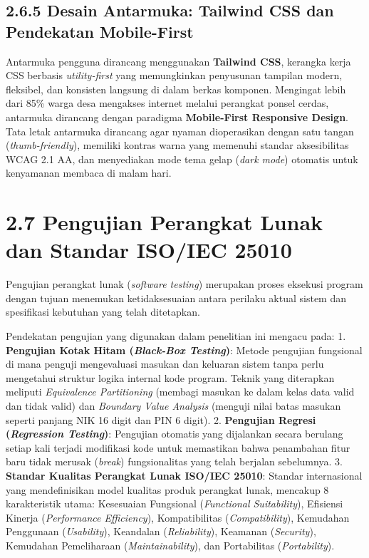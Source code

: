 \documentclass[
  indonesian,
  12pt,
]{report}
\begin{document}
\subsection{2.6.5 Desain Antarmuka: Tailwind CSS dan Pendekatan
Mobile-First}\label{desain-antarmuka-tailwind-css-dan-pendekatan-mobile-first}

Antarmuka pengguna dirancang menggunakan \textbf{Tailwind CSS}, kerangka
kerja CSS berbasis \emph{utility-first} yang memungkinkan penyusunan
tampilan modern, fleksibel, dan konsisten langsung di dalam berkas
komponen. Mengingat lebih dari 85\% warga desa mengakses internet
melalui perangkat ponsel cerdas, antarmuka dirancang dengan paradigma
\textbf{Mobile-First Responsive Design}. Tata letak antarmuka dirancang
agar nyaman dioperasikan dengan satu tangan (\emph{thumb-friendly}),
memiliki kontras warna yang memenuhi standar aksesibilitas WCAG 2.1 AA,
dan menyediakan mode tema gelap (\emph{dark mode}) otomatis untuk
kenyamanan membaca di malam hari.

\section{2.7 Pengujian Perangkat Lunak dan Standar ISO/IEC
25010}\label{pengujian-perangkat-lunak-dan-standar-isoiec-25010}

Pengujian perangkat lunak (\emph{software testing}) merupakan proses
eksekusi program dengan tujuan menemukan ketidaksesuaian antara perilaku
aktual sistem dan spesifikasi kebutuhan yang telah ditetapkan.

Pendekatan pengujian yang digunakan dalam penelitian ini mengacu pada:
1. \textbf{Pengujian Kotak Hitam (\emph{Black-Box Testing})}: Metode
pengujian fungsional di mana penguji mengevaluasi masukan dan keluaran
sistem tanpa perlu mengetahui struktur logika internal kode program.
Teknik yang diterapkan meliputi \emph{Equivalence Partitioning} (membagi
masukan ke dalam kelas data valid dan tidak valid) dan \emph{Boundary
Value Analysis} (menguji nilai batas masukan seperti panjang NIK 16
digit dan PIN 6 digit). 2. \textbf{Pengujian Regresi (\emph{Regression
Testing})}: Pengujian otomatis yang dijalankan secara berulang setiap
kali terjadi modifikasi kode untuk memastikan bahwa penambahan fitur
baru tidak merusak (\emph{break}) fungsionalitas yang telah berjalan
sebelumnya. 3. \textbf{Standar Kualitas Perangkat Lunak ISO/IEC 25010}:
Standar internasional yang mendefinisikan model kualitas produk
perangkat lunak, mencakup 8 karakteristik utama: Kesesuaian Fungsional
(\emph{Functional Suitability}), Efisiensi Kinerja (\emph{Performance
Efficiency}), Kompatibilitas (\emph{Compatibility}), Kemudahan
Penggunaan (\emph{Usability}), Keandalan (\emph{Reliability}), Keamanan
(\emph{Security}), Kemudahan Pemeliharaan (\emph{Maintainability}), dan
Portabilitas (\emph{Portability}).
\end{document}
